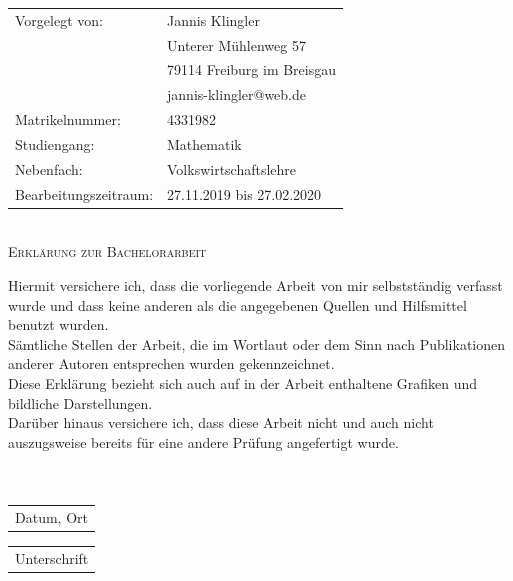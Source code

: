 \documentclass[11pt,titlepage]{article}
\theoremstyle{definition}
\theoremstyle{remark}
\begin{document}
	\thispagestyle{empty}
	\vspace*{17cm}
	\begin{tabular}{ll}
		Vorgelegt von: & Jannis Klingler \\
		& Unterer Mühlenweg 57\\
		& 79114 Freiburg im Breisgau
		\\
		& jannis-klingler@web.de\\
		Matrikelnummer: & {4331982} \\
		Studiengang: & {Mathematik}\\
		Nebenfach: & {Volkswirtschaftslehre}\\
		Bearbeitungszeitraum: & {27.11.2019 bis 27.02.2020} \\
	\end{tabular}\\
	
	\thispagestyle{empty}
		\vspace*{1cm}
		\LARGE\textsc{Erklärung zur Bachelorarbeit}
		
		\vspace{1.5cm}
		
		\normalsize 
		Hiermit versichere ich, dass die vorliegende Arbeit von mir selbstständig verfasst wurde und dass keine anderen als die angegebenen Quellen und Hilfsmittel benutzt wurden.\\ Sämtliche Stellen der Arbeit, die im Wortlaut oder dem Sinn nach Publikationen anderer Autoren entsprechen wurden gekennzeichnet.\\
		Diese Erklärung bezieht sich auch auf in der Arbeit enthaltene Grafiken und bildliche Darstellungen.\\
		Darüber hinaus versichere ich, dass diese Arbeit nicht und auch nicht auszugsweise bereits für eine andere Prüfung angefertigt wurde. 
		\ \\
		\ \\
		\ \\
		\begin{minipage}{0.57\textwidth}
			\begin{tabular}{@{}l@{}}\hline
				Datum, Ort \hspace{4.2cm}
			\end{tabular}
		\end{minipage}%
		\hfill
		\begin{minipage}{0.43\textwidth} 
			\begin{tabular}{@{}l@{}}\hline
				Unterschrift \hspace{4.2cm}
			\end{tabular}
		\end{minipage}
		
\end{document}
